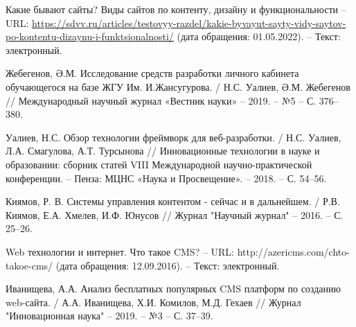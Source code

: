 \begin{thebibliography}{00}
		Какие бывают сайты? Виды сайтов по контенту, дизайну и функциональности
        --
        URL:
        \href{https://sdvv.ru/articles/testovyy-razdel/kakie-byvayut-sayty-vidy-saytov-po-kontentu-dizaynu-i-funktsionalnosti/}{https://sdvv.ru/articles/testovyy-razdel/kakie-byvayut-sayty-vidy-saytov-po-kontentu-dizaynu-i-funktsionalnosti/}
        (дата обращения: 01.05.2022).
        --
        Текст: электронный.
    

        Жебегенов, Ә.М. Исследование средств разработки личного кабинета обучающегося на базе ЖГУ Им. И.Жансугурова.
        /
        Н.С. Уалиев, Ә.М. Жебегенов
        //
        Международный научный журнал «Вестник науки»
        --
        2019.
        --
        №5
        --
        С. 376--380.

        Уалиев, Н.С. Обзор технологии фреймворк для веб-разработки.
        /
        Н.С. Уалиев, Л.А. Смагулова, А.Т. Турсынова
        //
        Инновационные технологии в науке и образовании: сборник статей VIII Международной научно-практической конференции.
        --
        Пенза: МЦНС «Наука и Просвещение».
        --
        2018.
        --
        С. 54--56.

        Киямов, Р. В. Системы управления контентом - сейчас и в дальнейшем.
        /
        Р.В. Киямов, Е.А. Хмелев, И.Ф. Юнусов
        //
        Журнал "Научный журнал"
        --
        2016.
        --
        С. 25--26.

        Web технологии и интернет. Что такое CMS?
        --
        URL:
        http://azericms.com/chto-takoe-cms/
        (дата обращения: 12.09.2016).
        --
        Текст: электронный.


        Иванищева, А.А. Анализ бесплатных популярных CMS платформ по созданию web-сайта.
        /
        А.А. Иванищева, Х.И. Комилов, М.Д. Гехаев
        //
        Журнал "Инновационная наука"
        --
        2019.
        --
        №3
        --
        С. 37--39.


\end{thebibliography}
